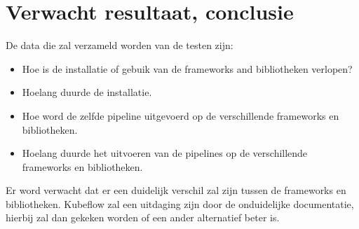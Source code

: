 




\section{Verwacht resultaat, conclusie}%
\label{sec:verwachte_resultaten}
De data die zal verzameld worden van de testen zijn:
\begin{itemize}
  \item Hoe is de installatie of gebuik van de frameworks and bibliotheken verlopen?
  \item Hoelang duurde de installatie.
  \item Hoe word de zelfde pipeline uitgevoerd op de verschillende frameworks en bibliotheken.
  \item Hoelang duurde het uitvoeren van de pipelines op de verschillende frameworks en bibliotheken.
\end{itemize}

Er word verwacht dat er een duidelijk verschil zal zijn tussen de frameworks en bibliotheken. Kubeflow zal een uitdaging zijn door de onduidelijke documentatie, hierbij zal dan gekeken worden of een ander alternatief beter is.

